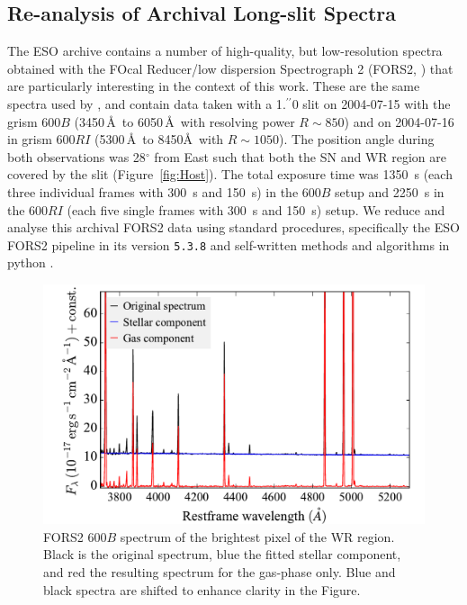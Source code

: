 \documentclass[traditabstract]{aa}
\newcommand{\farc}{\hbox{$.\!\!^{\prime\prime}$}}
\begin{document}
\begin{appendix}

\section{Re-analysis of Archival Long-slit Spectra}
\label{app:fors}

The ESO archive contains a number of high-quality, but low-resolution spectra obtained with the FOcal Reducer/low dispersion Spectrograph 2 (FORS2, \citealt{1998Msngr..94....1A}) that are particularly interesting in the context of this work. These are the same spectra used by \citet{2006A&A...454..103H}, and contain data taken with a 1\farc{0} slit on 2004-07-15 with the grism 600$B$ (3450\,\AA\, to 6050\,\AA\, with resolving power $R\sim850$) and on 2004-07-16 in grism 600$RI$ (5300\,\AA\, to 8450\AA\, with $R\sim1050$). The position angle during both observations was 28$^\circ$ from East such that both the SN and WR region are covered by the slit (Figure~\ref{fig:Host}). The total exposure time was 1350~s (each three individual frames with 300~s and 150~s) in the 600$B$ setup and 2250~s in the 600$RI$ (each five single frames with 300~s and 150~s) setup. We reduce and analyse this archival FORS2 data using standard procedures, specifically the ESO FORS2 pipeline in its version \texttt{5.3.8} and self-written methods and algorithms in python \citep{2015A&A...581A.125K}.

\begin{figure}
\includegraphics[angle=0, width=0.9\columnwidth]{Figs/FORS2_3700_5301_starlight.pdf}
\caption{FORS2 600$B$ spectrum of the brightest pixel of the WR region. Black is the original spectrum, blue the fitted stellar component, and red the resulting spectrum for the gas-phase only. Blue and black spectra are shifted to enhance clarity in the Figure.}
\label{fig:FORSWR}
\end{figure}


\end{appendix}
\end{document}
